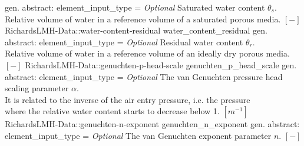 \begin{RecordType}
			{{gen. abstract: }}{{element{\_}input{\_}type}{ = }}
			{ \it{Optional}}
			{{{Saturated water content }{$ \theta_s $}{.}\\{
                Relative volume of water in a reference volume of a saturated porous media. }{$[-]$}%
}}
		\RecKey
			{RichardsLMH-Data::water-content-residual}
			{water{\_}content{\_}residual}
			{{gen. abstract: }}{{element{\_}input{\_}type}{ = }}
			{ \it{Optional}}
			{{{Residual water content }{$ \theta_r $}{.}\\{
                Relative volume of water in a reference volume of an ideally dry porous media. }{$[-]$}%
}}
		\RecKey
			{RichardsLMH-Data::genuchten-p-head-scale}
			{genuchten{\_}p{\_}head{\_}scale}
			{{gen. abstract: }}{{element{\_}input{\_}type}{ = }}
			{ \it{Optional}}
			{{{The van Genuchten pressure head scaling parameter }{$ \alpha $}{.}\\{
                It is related to the inverse of the air entry pressure, i.e. the pressure}\\{
                where the relative water content starts to decrease below 1. }{$[m^{-1}]$}%
}}
		\RecKey
			{RichardsLMH-Data::genuchten-n-exponent}
			{genuchten{\_}n{\_}exponent}
			{{gen. abstract: }}{{element{\_}input{\_}type}{ = }}
			{ \it{Optional}}
			{{{The van Genuchten exponent parameter }{$ n $}{. }{$[-]$}%
}}
\end{RecordType}
